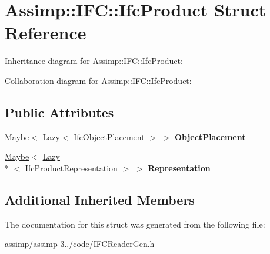 \hypertarget{struct_assimp_1_1_i_f_c_1_1_ifc_product}{\section{Assimp\+:\+:I\+F\+C\+:\+:Ifc\+Product Struct Reference}
\label{struct_assimp_1_1_i_f_c_1_1_ifc_product}
}


Inheritance diagram for Assimp\+:\+:I\+F\+C\+:\+:Ifc\+Product\+:


Collaboration diagram for Assimp\+:\+:I\+F\+C\+:\+:Ifc\+Product\+:
\subsection*{Public Attributes}
\begin{DoxyCompactItemize}
\item 
\hypertarget{struct_assimp_1_1_i_f_c_1_1_ifc_product_a16bbf2a411b31f164e5805a0794e0fc9}{\hyperlink{struct_assimp_1_1_s_t_e_p_1_1_maybe}{Maybe}$<$ \hyperlink{struct_assimp_1_1_s_t_e_p_1_1_lazy}{Lazy}$<$ \hyperlink{struct_assimp_1_1_i_f_c_1_1_ifc_object_placement}{Ifc\+Object\+Placement} $>$ $>$ {\bfseries Object\+Placement}}\label{struct_assimp_1_1_i_f_c_1_1_ifc_product_a16bbf2a411b31f164e5805a0794e0fc9}

\item 
\hypertarget{struct_assimp_1_1_i_f_c_1_1_ifc_product_a21e6a4a5aa86fcf5f256d90ded89ef61}{\hyperlink{struct_assimp_1_1_s_t_e_p_1_1_maybe}{Maybe}$<$ \hyperlink{struct_assimp_1_1_s_t_e_p_1_1_lazy}{Lazy}\\*
$<$ \hyperlink{struct_assimp_1_1_i_f_c_1_1_ifc_product_representation}{Ifc\+Product\+Representation} $>$ $>$ {\bfseries Representation}}\label{struct_assimp_1_1_i_f_c_1_1_ifc_product_a21e6a4a5aa86fcf5f256d90ded89ef61}

\end{DoxyCompactItemize}
\subsection*{Additional Inherited Members}


The documentation for this struct was generated from the following file\+:\begin{DoxyCompactItemize}
\item 
assimp/assimp-\/3../code/I\+F\+C\+Reader\+Gen.\+h\end{DoxyCompactItemize}
